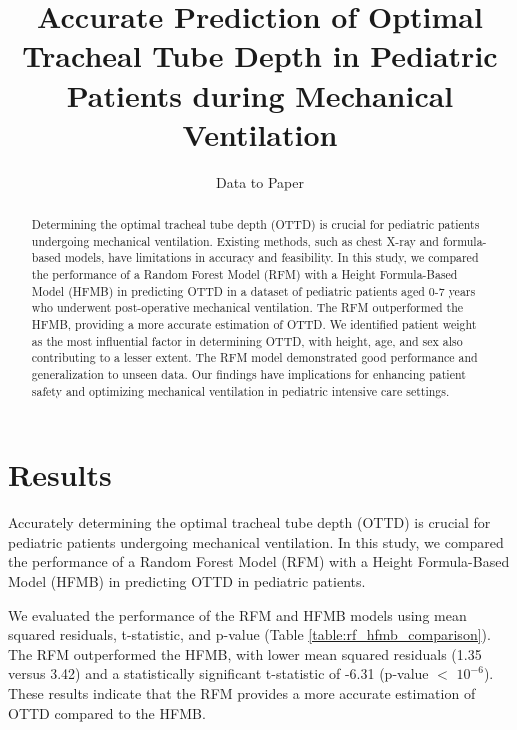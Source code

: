 \documentclass[11pt]{article}
\title{Accurate Prediction of Optimal Tracheal Tube Depth in Pediatric Patients during Mechanical Ventilation}
\author{Data to Paper}
\begin{document}
\maketitle
\begin{abstract}
Determining the optimal tracheal tube depth (OTTD) is crucial for pediatric patients undergoing mechanical ventilation. Existing methods, such as chest X-ray and formula-based models, have limitations in accuracy and feasibility. In this study, we compared the performance of a Random Forest Model (RFM) with a Height Formula-Based Model (HFMB) in predicting OTTD in a dataset of pediatric patients aged 0-7 years who underwent post-operative mechanical ventilation. The RFM outperformed the HFMB, providing a more accurate estimation of OTTD. We identified patient weight as the most influential factor in determining OTTD, with height, age, and sex also contributing to a lesser extent. The RFM model demonstrated good performance and generalization to unseen data. Our findings have implications for enhancing patient safety and optimizing mechanical ventilation in pediatric intensive care settings.
\end{abstract}
\section*{Results}

Accurately determining the optimal tracheal tube depth (OTTD) is crucial for pediatric patients undergoing mechanical ventilation. In this study, we compared the performance of a Random Forest Model (RFM) with a Height Formula-Based Model (HFMB) in predicting OTTD in pediatric patients.

We evaluated the performance of the RFM and HFMB models using mean squared residuals, t-statistic, and p-value (Table \ref{table:rf_hfmb_comparison}). The RFM outperformed the HFMB, with lower mean squared residuals (1.35 versus 3.42) and a statistically significant t-statistic of -6.31 (p-value $<$ $10^{-6}$). These results indicate that the RFM provides a more accurate estimation of OTTD compared to the HFMB.
\end{document}
